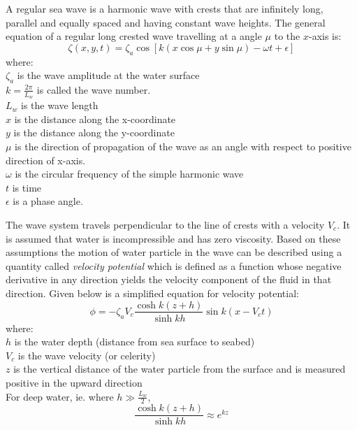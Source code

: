 A regular sea wave is a harmonic wave with crests that are infinitely long,
parallel and equally spaced and having constant wave heights. The general 
equation of a regular long crested wave travelling at a angle $\mu$ to the 
$x$-axis is:
\begin{equation}
  \zeta (x,y,t) = \zeta_a \cos[k(x \cos \mu + y \sin \mu) - \omega t + \epsilon]
  \label {eq: 2D wave equation}
\end{equation}
where: \\ 
$\zeta_a$ is the wave amplitude at the water surface\\ 
$k = \frac{2 \pi}{L_w}$ is called the wave number.\\ 
$L_w$ is the wave length\\ 
$x$ is the distance along the x-coordinate\\
$y$ is the distance along the y-coordinate\\
$\mu$ is the direction of propagation of the wave as an angle with respect to
positive direction of x-axis.\\
$\omega$ is the circular frequency of the simple harmonic wave\\
$t$ is time\\
$\epsilon$ is a phase angle. 


The wave system travels perpendicular to the line of crests with a velocity
$V_c$. It is assumed that water is incompressible and has zero viscosity. Based
on these assumptions the motion of water particle in the wave can be described
using a quantity called \textit{velocity potential} which is defined as a function
whose negative derivative in any direction yields the velocity component of the
fluid in that direction. Given
below is a simplified equation for velocity potential:
\begin{equation}
  \phi = - \zeta_a V_c \frac{\cosh k(z + h)}{\sinh k h} \sin k(x - V_c t)
  \label {eq: 2D wave velocity potential}
\end{equation}
where:\\
$h$ is the water depth (distance from sea surface to seabed)\\ 
$V_c$ is the wave velocity (or celerity)\\ 
$z$ is the vertical distance of the water particle from the surface and is 
measured positive in the upward direction\\ 

For deep water, ie. where $h \gg \frac{L_w}{2}$, 
\begin{equation}
  \frac{\cosh k(z + h)}{\sinh k h} \approx e^{k z}
  \label{eq: ratio approx for deep water}
\end{equation}

